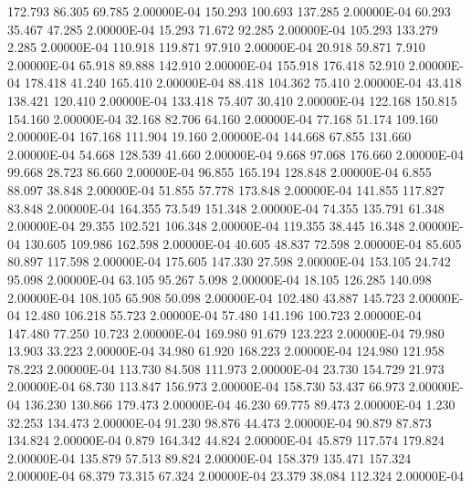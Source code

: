    172.793    86.305    69.785  2.00000E-04
   150.293   100.693   137.285  2.00000E-04
    60.293    35.467    47.285  2.00000E-04
    15.293    71.672    92.285  2.00000E-04
   105.293   133.279     2.285  2.00000E-04
   110.918   119.871    97.910  2.00000E-04
    20.918    59.871     7.910  2.00000E-04
    65.918    89.888   142.910  2.00000E-04
   155.918   176.418    52.910  2.00000E-04
   178.418    41.240   165.410  2.00000E-04
    88.418   104.362    75.410  2.00000E-04
    43.418   138.421   120.410  2.00000E-04
   133.418    75.407    30.410  2.00000E-04
   122.168   150.815   154.160  2.00000E-04
    32.168    82.706    64.160  2.00000E-04
    77.168    51.174   109.160  2.00000E-04
   167.168   111.904    19.160  2.00000E-04
   144.668    67.855   131.660  2.00000E-04
    54.668   128.539    41.660  2.00000E-04
     9.668    97.068   176.660  2.00000E-04
    99.668    28.723    86.660  2.00000E-04
    96.855   165.194   128.848  2.00000E-04
     6.855    88.097    38.848  2.00000E-04
    51.855    57.778   173.848  2.00000E-04
   141.855   117.827    83.848  2.00000E-04
   164.355    73.549   151.348  2.00000E-04
    74.355   135.791    61.348  2.00000E-04
    29.355   102.521   106.348  2.00000E-04
   119.355    38.445    16.348  2.00000E-04
   130.605   109.986   162.598  2.00000E-04
    40.605    48.837    72.598  2.00000E-04
    85.605    80.897   117.598  2.00000E-04
   175.605   147.330    27.598  2.00000E-04
   153.105    24.742    95.098  2.00000E-04
    63.105    95.267     5.098  2.00000E-04
    18.105   126.285   140.098  2.00000E-04
   108.105    65.908    50.098  2.00000E-04
   102.480    43.887   145.723  2.00000E-04
    12.480   106.218    55.723  2.00000E-04
    57.480   141.196   100.723  2.00000E-04
   147.480    77.250    10.723  2.00000E-04
   169.980    91.679   123.223  2.00000E-04
    79.980    13.903    33.223  2.00000E-04
    34.980    61.920   168.223  2.00000E-04
   124.980   121.958    78.223  2.00000E-04
   113.730    84.508   111.973  2.00000E-04
    23.730   154.729    21.973  2.00000E-04
    68.730   113.847   156.973  2.00000E-04
   158.730    53.437    66.973  2.00000E-04
   136.230   130.866   179.473  2.00000E-04
    46.230    69.775    89.473  2.00000E-04
     1.230    32.253   134.473  2.00000E-04
    91.230    98.876    44.473  2.00000E-04
    90.879    87.873   134.824  2.00000E-04
     0.879   164.342    44.824  2.00000E-04
    45.879   117.574   179.824  2.00000E-04
   135.879    57.513    89.824  2.00000E-04
   158.379   135.471   157.324  2.00000E-04
    68.379    73.315    67.324  2.00000E-04
    23.379    38.084   112.324  2.00000E-04
